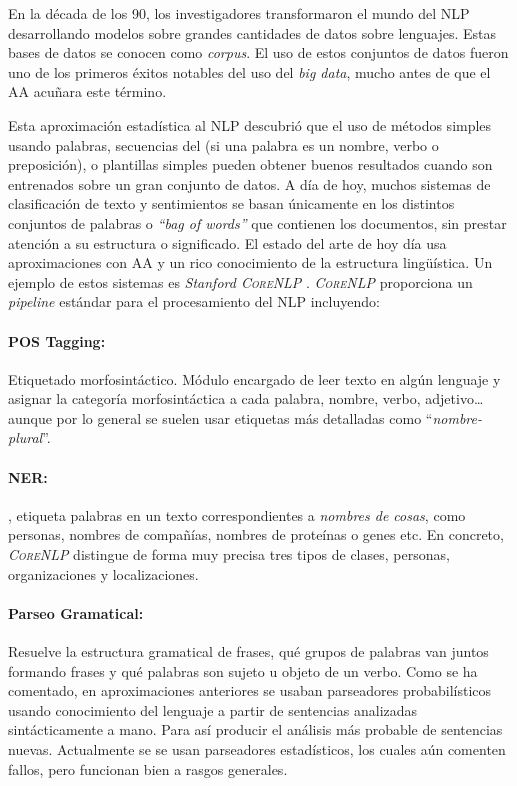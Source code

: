 En la década de los 90, los investigadores transformaron el mundo del \ac{NLP}
desarrollando modelos sobre grandes cantidades de datos sobre lenguajes. Estas
bases de datos se conocen como \emph{corpus}. El uso de estos conjuntos de datos
fueron uno de los primeros éxitos notables del uso del \emph{big data}, mucho
antes de que el \ac{AA} acuñara este término.

Esta aproximación estadística al \ac{NLP} descubrió que el uso de métodos
simples usando palabras, secuencias del
 (si una palabra es un nombre, verbo o preposición), o plantillas
simples pueden obtener buenos resultados cuando son entrenados sobre un gran
conjunto de datos. A día de hoy, muchos sistemas de clasificación de texto y
sentimientos se basan únicamente en los distintos conjuntos de palabras o
\emph{``bag of words''} que contienen los documentos, sin prestar atención a su
estructura o significado. El estado del arte de hoy día usa aproximaciones con
\ac{AA} y un rico conocimiento de la estructura lingüística. Un ejemplo de estos
sistemas es \emph{Stanford \textsc{CoreNLP}} \citep{Manning2014}. \emph{\textsc{CoreNLP}}
proporciona un \emph{pipeline} estándar para el procesamiento del \ac{NLP}
incluyendo:

\paragraph{POS Tagging:}Etiquetado morfosintáctico. Módulo encargado de leer
texto en algún lenguaje y asignar la categoría morfosintáctica a cada palabra,
\eg nombre, verbo, adjetivo\dots aunque por lo general se suelen usar etiquetas
más detalladas como ``\emph{nombre-plural}''.

\paragraph{NER:}, etiqueta palabras en un texto
correspondientes a \emph{nombres de cosas}, como personas, nombres de compañías,
nombres de proteínas o genes etc. En concreto, \emph{\textsc{CoreNLP}} distingue de forma
muy precisa tres tipos de clases, personas, organizaciones y localizaciones.

\paragraph{Parseo Gramatical:}Resuelve la estructura gramatical de frases, \eg
qué grupos de palabras van juntos formando frases y qué palabras son sujeto u
objeto de un verbo. Como se ha comentado, en aproximaciones anteriores se usaban
parseadores probabilísticos usando conocimiento del lenguaje a partir de
sentencias analizadas sintácticamente a mano. Para así producir el análisis más
probable de sentencias nuevas. Actualmente se se usan parseadores estadísticos,
los cuales aún comenten fallos, pero funcionan bien a rasgos generales.

